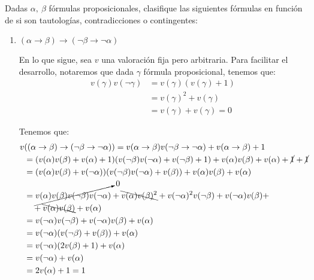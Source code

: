 \begin{ejercicio}
    Dadas $\alpha,~\beta$ fórmulas proposicionales,
    clasifique las siguientes fórmulas en función de si son tautologías, contradicciones o contingentes:
    \begin{enumerate}
        \item $(\alpha\rightarrow\beta)\rightarrow(\lnot\beta\rightarrow\lnot\alpha)$
        
        En lo que sigue, sea $v$ una valoración fija pero arbitraria.
        Para facilitar el desarrollo, notaremos que dada $\gamma$ fórmula proposicional, tenemos que:
        \begin{align*}
            v(\gamma)v(\lnot \gamma)
            &= v(\gamma)(v(\gamma)+1)\\
            &= v(\gamma)^2 + v(\gamma)\\
            &= v(\gamma) + v(\gamma) = 0
        \end{align*}
        
        Tenemos que:
        \begin{align*}
            v&((\alpha\rightarrow\beta)\rightarrow(\lnot\beta\rightarrow\lnot\alpha)) 
            = v(\alpha\rightarrow\beta)v(\lnot\beta\rightarrow\lnot\alpha)+ v(\alpha\rightarrow\beta) + 1 \\
            &= (v(\alpha)v(\beta)+v(\alpha) + 1) (v(\lnot\beta)v(\lnot\alpha)+v(\lnot\beta)+1)
            + v(\alpha)v(\beta)+v(\alpha)+\cancel{1}+\cancel{1} \\
            &= (v(\alpha)v(\beta)+v(\lnot \alpha)) (v(\lnot\beta)v(\lnot\alpha)+v(\beta))
            + v(\alpha)v(\beta)+v(\alpha) \\
            &= \cancelto{0}{v(\alpha)v(\beta)v(\lnot\beta)v(\lnot\alpha)} + \bcancel{v(\alpha)v(\beta)^2}
            + v(\lnot \alpha)^2 v(\lnot\beta) + v(\lnot\alpha)v(\beta) +\\
            &\quad + \bcancel{v(\alpha)v(\beta)}+v(\alpha)\\
            &= v(\lnot\alpha)v(\lnot\beta) + v(\lnot\alpha)v(\beta) + v(\alpha)\\
            &= v(\lnot\alpha)(v(\lnot\beta)+v(\beta))+v(\alpha)\\
            &= v(\lnot\alpha)(2v(\beta)+1)+v(\alpha)\\
            &= v(\lnot\alpha)+v(\alpha)\\
            &= 2v(\alpha) +1 = 1
        \end{align*}
        

\end{enumerate}
\end{ejercicio}
